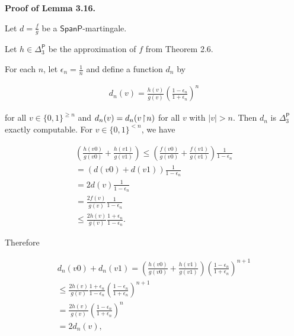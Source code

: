\documentclass[10pt,a4paper]{article}
\begin{document}
\par\medskip\noindent\textbf{Proof of Lemma 3.16.}\par




Let $d=\frac{f}{g}$ be a $\mathsf{SpanP}$-martingale.

Let $h\in{\Delta^{\mathsf{P}}_{3}}$ be the approximation of $f$ from Theorem
2.6.\par




For each $n$, let $\epsilon_{n}=\frac{1}{n}$ and define a function $d_{n}$ by\par


\[\begin{gathered}
d_{n}(v)=\frac{h(v)}{g(v)}\left(\frac{1-\epsilon_{n}}{1+\epsilon_{n}}\right)^{n}
\end{gathered}\]


for all $v\in\{0,1\}^{\geq n}$ and
$d_{n}(v)=d_{n}(v\negthinspace\upharpoonright\negthinspace n)$
for all $v$ with $|v|>n$. Then $d_{n}$ is ${\Delta^{\mathsf{P}}_{3}}$ exactly computable.
For $v\in\{0,1\}^{<n}$, we have\par


\[\begin{gathered}
\displaystyle\left(\frac{h(v0)}{g(v0)}+\frac{h(v1)}{g(v1)}\right) \displaystyle\leq \displaystyle\left(\frac{f(v0)}{g(v0)}+\frac{f(v1)}{g(v1)}\right)\frac{1}{1-\epsilon_{n}} \\
\displaystyle= \displaystyle\left(d(v0)+d(v1)\right)\frac{1}{1-\epsilon_{n}} \\
\displaystyle= \displaystyle 2d(v)\frac{1}{1-\epsilon_{n}} \\
\displaystyle= \displaystyle\frac{2f(v)}{g(v)}\frac{1}{1-\epsilon_{n}} \\
\displaystyle\leq \displaystyle\frac{2h(v)}{g(v)}\frac{1+\epsilon_{n}}{1-\epsilon_{n}}.
\end{gathered}\]


Therefore\par


\[\begin{gathered}
\displaystyle d_{n}(v0)+d_{n}(v1) \displaystyle= \displaystyle\left(\frac{h(v0)}{g(v0)}+\frac{h(v1)}{g(v1)}\right)\left(\frac{1-\epsilon_{n}}{1+\epsilon_{n}}\right)^{n+1} \\
\displaystyle\leq \displaystyle\frac{2h(v)}{g(v)}\frac{1+\epsilon_{n}}{1-\epsilon_{n}}\left(\frac{1-\epsilon_{n}}{1+\epsilon_{n}}\right)^{n+1} \\
\displaystyle= \displaystyle\frac{2h(v)}{g(v)}\left(\frac{1-\epsilon_{n}}{1+\epsilon_{n}}\right)^{n} \\
\displaystyle= \displaystyle 2d_{n}(v),
\end{gathered}\]
\end{document}
